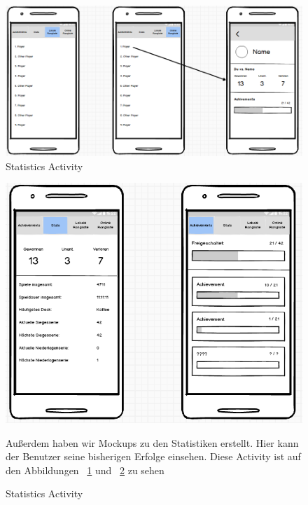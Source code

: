 \documentclass{scrartcl}
\begin{document}
\begin{figure}[!ht]
\begin{center}
	\includegraphics[scale=0.58]{img/mockup_stats_1.png}
	\caption{Statistics Activity}
	\label{stats1}
\end{center}
\end{figure}

\begin{figure}[!ht]
\begin{center}
\centering
	\includegraphics[scale=0.75]{img/mockup_stats_2.png}
	\caption{Statistics Activity}
	\label{stats2}
\end{center}
Außerdem haben wir Mockups zu den Statistiken erstellt. Hier kann der Benutzer seine bisherigen Erfolge einsehen. Diese Activity ist auf den Abbildungen ~\ref{stats1} und ~\ref{stats2} zu sehen
\end{figure}

\clearpage
\end{document}
